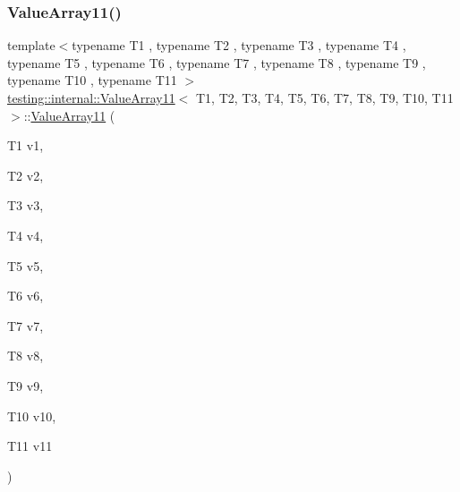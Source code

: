 \subsubsection{\texorpdfstring{ValueArray11()}{ValueArray11()}\hspace{0.1cm}{\footnotesize\ttfamily [1/2]}}
{\footnotesize\ttfamily template$<$typename T1 , typename T2 , typename T3 , typename T4 , typename T5 , typename T6 , typename T7 , typename T8 , typename T9 , typename T10 , typename T11 $>$ \\
\mbox{\hyperlink{classtesting_1_1internal_1_1_value_array11}{testing\+::internal\+::\+Value\+Array11}}$<$ T1, T2, T3, T4, T5, T6, T7, T8, T9, T10, T11 $>$\+::\mbox{\hyperlink{classtesting_1_1internal_1_1_value_array11}{Value\+Array11}} (\begin{DoxyParamCaption}\item[{T1}]{v1,  }\item[{T2}]{v2,  }\item[{T3}]{v3,  }\item[{T4}]{v4,  }\item[{T5}]{v5,  }\item[{T6}]{v6,  }\item[{T7}]{v7,  }\item[{T8}]{v8,  }\item[{T9}]{v9,  }\item[{T10}]{v10,  }\item[{T11}]{v11 }\end{DoxyParamCaption})\hspace{0.3cm}{\ttfamily [inline]}}

\mbox{\label{classtesting_1_1internal_1_1_value_array11_a09b4890b05313d04d98cbb5507d9b34e}} 
